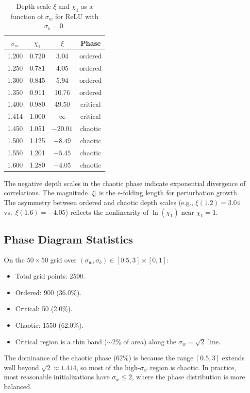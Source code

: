 \documentclass[10pt]{article}
\theoremstyle{definition}
\begin{document}
\begin{table}[htbp]
\centering
\caption{Depth scale $\xi$ and $\chi_1$ as a function of $\sigma_w$ for ReLU with $\sigma_b = 0$.}
\label{tab:depth-scale-sweep}
\begin{tabular}{cccc}
\toprule
$\sigma_w$ & $\chi_1$ & $\xi$ & Phase \\
\midrule
1.200 & 0.720 & 3.04  & ordered \\
1.250 & 0.781 & 4.05  & ordered \\
1.300 & 0.845 & 5.94  & ordered \\
1.350 & 0.911 & 10.76 & ordered \\
1.400 & 0.980 & 49.50 & critical \\
1.414 & 1.000 & $\infty$ & critical \\
1.450 & 1.051 & $-20.01$ & chaotic \\
1.500 & 1.125 & $-8.49$ & chaotic \\
1.550 & 1.201 & $-5.45$ & chaotic \\
1.600 & 1.280 & $-4.05$ & chaotic \\
\bottomrule
\end{tabular}
\end{table}

The negative depth scales in the chaotic phase indicate exponential divergence of correlations.
The magnitude $|\xi|$ is the e-folding length for perturbation growth.
The asymmetry between ordered and chaotic depth scales (e.g., $\xi(1.2) = 3.04$ vs.\ $\xi(1.6) = -4.05$) reflects the nonlinearity of $\ln(\chi_1)$ near $\chi_1 = 1$.

\subsection{Phase Diagram Statistics}

On the $50 \times 50$ grid over $(\sigma_w, \sigma_b) \in [0.5, 3] \times [0, 1]$:
\begin{itemize}[nosep]
  \item Total grid points: 2500.
  \item Ordered: 900 (36.0\%).
  \item Critical: 50 (2.0\%).
  \item Chaotic: 1550 (62.0\%).
  \item Critical region is a thin band ($\sim$2\% of area) along the $\sigma_w = \sqrt{2}$ line.
\end{itemize}

The dominance of the chaotic phase (62\%) is because the range $[0.5, 3]$ extends well beyond $\sqrt{2} \approx 1.414$, so most of the high-$\sigma_w$ region is chaotic.
In practice, most reasonable initializations have $\sigma_w \leq 2$, where the phase distribution is more balanced.
\end{document}
